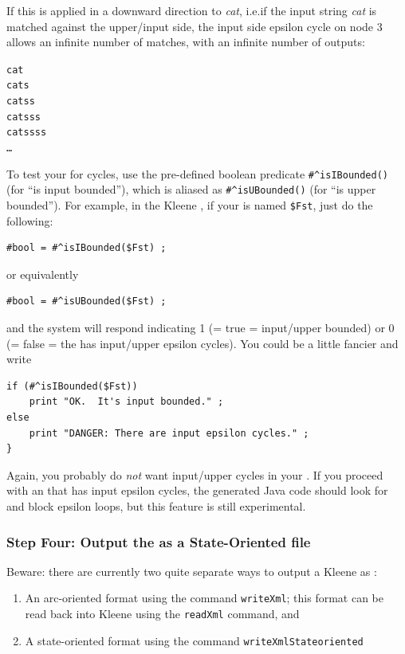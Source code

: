 \noindent
If this \fsm{} is applied in a downward direction to \emph{cat}, i.e.\@ if the input string
\emph{cat} is matched against the upper/input side, the input side epsilon cycle on node 3
allows an infinite number of matches, with an infinite number of outputs:

\begin{alltt}
cat
cats
catss
catsss
catssss
\ldots{}
\end{alltt}

To test your \fsm{} for cycles, use the
pre-defined boolean predicate \verb!#^isIBounded()! (for ``is input bounded''), which is aliased as
\verb!#^isUBounded()! (for ``is upper bounded'').
For example, in the Kleene \gui{}, if your \fsm{} is named \verb!$Fst!, just do the
following:

\begin{Verbatim}
#bool = #^isIBounded($Fst) ;
\end{Verbatim}

\noindent
or equivalently

\begin{Verbatim}
#bool = #^isUBounded($Fst) ;
\end{Verbatim}

\noindent
and the system will respond indicating 1 (= true = input/upper bounded)
or 0 (= false = the \fsm{} has input/upper epsilon cycles).   
You could be a little fancier and write

\begin{Verbatim}
if (#^isIBounded($Fst))
    print "OK.  It's input bounded." ;
else
    print "DANGER: There are input epsilon cycles." ;
}
\end{Verbatim}

\noindent
Again, you
probably do \emph{not} want input/upper cycles in your \fsm{}.  If you proceed with an \fsm{}
that has input epsilon cycles, the generated Java code should look
for and block epsilon loops, but this feature is still experimental.

\subsubsection{Step Four: Output the \fsm{} as a State-Oriented \xml{} file}

Beware: there are currently two quite separate ways to output a Kleene \fsm{} as \xml{}:

\begin{enumerate}
\item
An arc-oriented format using the command \texttt{writeXml}; this
	\xml{} format can be read back into Kleene using the \texttt{readXml} command, and
\item
A state-oriented \xml{} format using the command \texttt{writeXmlStateoriented}
\end{enumerate}

